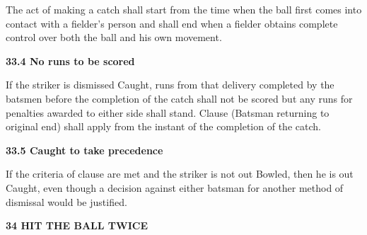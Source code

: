 \documentclass[12pt]{article}
\begin{document}
\vspace{\baselineskip}
\begin{adjustwidth}{0.0in}{0.17in}
{\fontsize{9pt}{10.8pt}\selectfont The act of making a catch shall start from the time when the ball first comes into contact with a fielder’s person and shall end when a fielder obtains complete control over both the ball and his own movement.\par}\par

\end{adjustwidth}


\vspace{\baselineskip}
{\fontsize{11pt}{13.2pt}\selectfont \textbf{33.4 \tabto{0.47in} No runs to be scored}\par}\par


\vspace{\baselineskip}
\begin{adjustwidth}{0.0in}{0.31in}
\begin{justify}
{\fontsize{9pt}{10.8pt}\selectfont If the striker is dismissed Caught, runs from that delivery completed by the batsmen before the completion of the catch shall not be scored but any runs for penalties awarded to either side shall stand. Clause (Batsman returning to original end) shall apply from the instant of the completion of the catch.\par}
\end{justify}\par

\end{adjustwidth}


\vspace{\baselineskip}
{\fontsize{11pt}{13.2pt}\selectfont \textbf{33.5 \tabto{0.47in} Caught to take precedence}\par}\par


\vspace{\baselineskip}
\begin{adjustwidth}{0.0in}{0.11in}
{\fontsize{9pt}{10.8pt}\selectfont If the criteria of clause are met and the striker is not out Bowled, then he is out Caught, even though a decision against either batsman for another method of dismissal would be justified.\par}\par

\end{adjustwidth}


\vspace{\baselineskip}
{\fontsize{16pt}{19.2pt}\selectfont \textbf{34 HIT THE BALL TWICE}\par}\par
\end{document}
